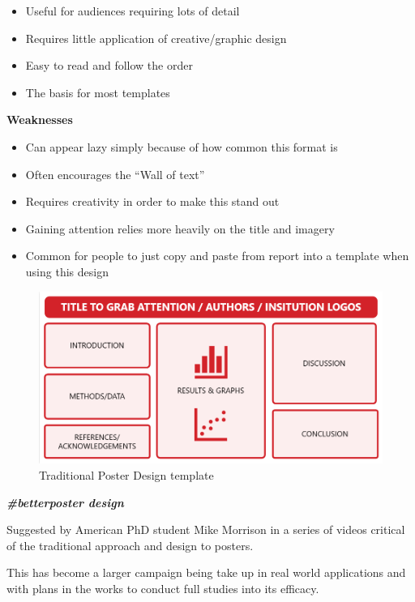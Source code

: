 \documentclass[
  titlepage]{book}
\providecommand{\tightlist}{%
  \setlength{\itemsep}{0pt}\setlength{\parskip}{0pt}}
\begin{document}
\begin{itemize}
\tightlist
\item
  Useful for audiences requiring lots of detail
\item
  Requires little application of creative/graphic design
\item
  Easy to read and follow the order
\item
  The basis for most templates
\end{itemize}

\textbf{Weaknesses}

\begin{itemize}
\tightlist
\item
  Can appear lazy simply because of how common this format is
\item
  Often encourages the ``Wall of text''
\item
  Requires creativity in order to make this stand out
\item
  Gaining attention relies more heavily on the title and imagery
\item
  Common for people to just copy and paste from report into a template when using this design
\end{itemize}

\begin{figure}
\centering
\includegraphics{img/Traditional Poster design template.png}
\caption{Traditional Poster Design template}
\end{figure}

\textbf{\emph{\#betterposter design}}

Suggested by American PhD student Mike Morrison in a series of videos critical of the traditional approach and design to posters.

This has become a larger campaign being take up in real world applications and with plans in the works to conduct full studies into its efficacy.
\end{document}
